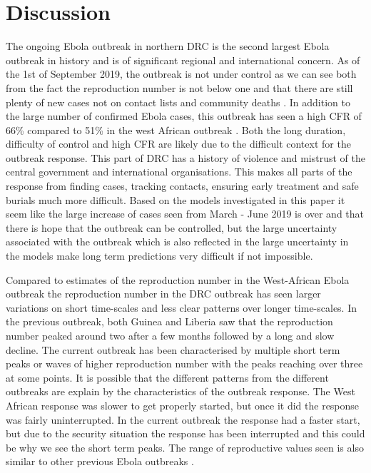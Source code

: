 \documentclass[12pt]{article}
\begin{document}
\section{Discussion}


The ongoing Ebola outbreak in northern DRC is the second largest Ebola outbreak in history and is of significant regional and international concern. As of the 1st of September 2019, the outbreak is not under control as we can see both from the fact the reproduction number is not below one and that there are still plenty of new cases not on contact lists and community deaths \cite{worldhealthorganisationDiseaseOutbreakNews}. In addition to the large number of confirmed Ebola cases, this outbreak has seen a high CFR of 66\% compared to 51\% in the west African outbreak \cite{rojekSystematicReviewMetaanalysis2019}. Both the long duration, difficulty of control and high CFR are likely due to the difficult context for the outbreak response. This part of DRC has a history of violence and mistrust of the central government and international organisations. This makes all parts of the response from finding cases, tracking contacts, ensuring early treatment and safe burials much more difficult. Based on the models investigated in this paper it seem like the large increase of cases seen from March - June 2019 is over and that there is hope that the outbreak can be controlled, but the large uncertainty associated with the outbreak which is also reflected in the large uncertainty in the models make long term predictions very difficult if not impossible.

Compared to estimates of the reproduction number in the West-African Ebola outbreak \cite{WestAfricanEbola2015} the reproduction number in the DRC outbreak has seen larger variations on short time-scales and less clear patterns over longer time-scales. In the previous outbreak, both Guinea and Liberia saw that the reproduction number peaked around two after a few months followed by a long and slow decline. The current outbreak has been characterised by multiple short term peaks or waves of higher reproduction number with the peaks reaching over three at some points. It is possible that the different patterns from the different outbreaks are explain by the characteristics of the outbreak response. The West African response was slower to get properly started, but once it did the response was fairly uninterrupted. In the current outbreak the response had a faster start, but due to the security situation the response has been interrupted and this could be why we see the short term peaks. The range of reproductive values seen is also similar to other previous Ebola outbreaks \cite{legrandUnderstandingDynamicsEbola2007}.
\end{document}
